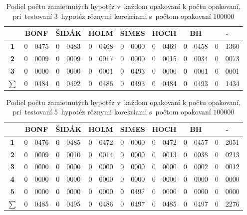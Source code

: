 \begin{table}[h!]
  \centering
  \begin{tabular}{c|r@{.}lr@{.}lr@{.}lr@{.}lr@{.}lr@{.}lr@{.}l}
     & \multicolumn{2}{c}{\bf BONF} & \multicolumn{2}{c}{\bf ŠIDÁK} & \multicolumn{2}{c}{\bf HOLM} & \multicolumn{2}{c}{\bf SIMES} 
     & \multicolumn{2}{c}{\bf HOCH} & \multicolumn{2}{c}{\bf BH} & \multicolumn{2}{c}{\bf -} \\ \hline
    {\bf 1} & 0&0475 & 0&0483 & 0&0468 & 0&0000 & 0&0469 & 0&0458 & 0&1360 \\ 
    {\bf 2} & 0&0009 & 0&0009 & 0&0017 & 0&0000 & 0&0015 & 0&0034 & 0&0073 \\ 
    {\bf 3} & 0&0000 & 0&0000 & 0&0001 & 0&0493 & 0&0000 & 0&0001 & 0&0001 \\ \hline
    {\bf $\sum$} & 0&0484 & 0&0492 & 0&0486 & 0&0493 & 0&0484 & 0&0493 & 0&1434 \\ 
  \end{tabular}
  \caption{Podiel počtu zamietnutých hypotéz v~každom opakovaní k počtu opakovaní, 
  pri~testovaní $3$~hypotéz rôznymi korekciami s~počtom opakovaní $100000$}
  \captionsetup{justification=centering}
  \label{tab04:1}
\end{table}

\begin{table}[h!]
  \centering
  \begin{tabular}{c|r@{.}lr@{.}lr@{.}lr@{.}lr@{.}lr@{.}lr@{.}l}
    & \multicolumn{2}{c}{\bf BONF} & \multicolumn{2}{c}{\bf ŠIDÁK} & \multicolumn{2}{c}{\bf HOLM} & \multicolumn{2}{c}{\bf SIMES} 
    & \multicolumn{2}{c}{\bf HOCH} & \multicolumn{2}{c}{\bf BH} & \multicolumn{2}{c}{\bf -} \\ \hline
    {\bf 1} & 0&0476 & 0&0485 & 0&0472 & 0&0000 & 0&0472 & 0&0457 & 0&2051 \\ 
    {\bf 2} & 0&0009 & 0&0010 & 0&0014 & 0&0000 & 0&0013 & 0&0038 & 0&0213 \\ 
    {\bf 3} & 0&0000 & 0&0000 & 0&0000 & 0&0000 & 0&0000 & 0&0002 & 0&0012 \\ 
    {\bf 4} & 0&0000 & 0&0000 & 0&0000 & 0&0000 & 0&0000 & 0&0000 & 0&0000 \\ 
    {\bf 5} & 0&0000 & 0&0000 & 0&0000 & 0&0497 & 0&0000 & 0&0000 & 0&0000 \\ \hline
    {\bf $\sum$} & 0&0485 & 0&0495 & 0&0486 & 0&0497 & 0&0485 & 0&0497 & 0&2276 \\ 
  \end{tabular}
  \caption{Podiel počtu zamietnutých hypotéz v~každom opakovaní k počtu opakovaní, 
  pri~testovaní $5$~hypotéz rôznymi korekciami s~počtom opakovaní $100000$}
  \captionsetup{justification=centering}
  \label{tab04:2}
\end{table}

